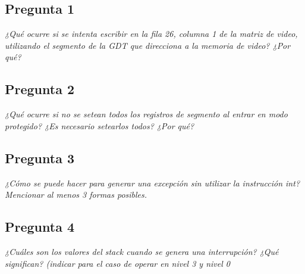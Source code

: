 \begin{minipage}{\linewidth}
	\subsection{Pregunta 1}
		\begin{minipage}{\linewidth}
			\textit{¿Qué ocurre si se intenta escribir en la fila 26, columna 1 de la matriz de video, utilizando el segmento de la GDT que direcciona a la memoria de video? ¿Por qué?}
			
			
		\end{minipage}
\end{minipage}

\begin{minipage}{\linewidth}
	\subsection{Pregunta 2}
		\begin{minipage}{\linewidth}
			\textit{¿Qué ocurre si no se setean todos los registros de segmento al entrar en
modo protegido? ¿Es necesario setearlos todos? ¿Por qué?}

			
		\end{minipage}
\end{minipage}

\begin{minipage}{\linewidth}
	\subsection{Pregunta 3}
		\begin{minipage}{\linewidth}
			\textit{¿Cómo se puede hacer para generar una excepción sin utilizar la instrucción int? Mencionar al menos 3 formas posibles.}
			
			
		\end{minipage}
\end{minipage}

\begin{minipage}{\linewidth}
	\subsection{Pregunta 4}
		\begin{minipage}{\linewidth}
			\textit{¿Cuáles son los valores del stack cuando se genera una interrupción? ¿Qué significan? (indicar para el caso de operar en nivel 3 y nivel 0}
			
			
		\end{minipage}
\end{minipage}

